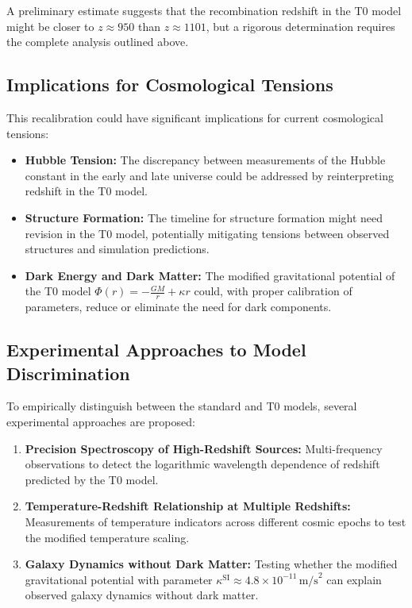 \documentclass[12pt,a4paper]{article}
\begin{document}
	A preliminary estimate suggests that the recombination redshift in the T0 model might be closer to $z \approx 950$ than $z \approx 1101$, but a rigorous determination requires the complete analysis outlined above.
	
	\subsection{Implications for Cosmological Tensions}
	\label{subsec:cosmological_tensions}
	
	This recalibration could have significant implications for current cosmological tensions:
	
	\begin{itemize}
		\item \textbf{Hubble Tension:} The discrepancy between measurements of the Hubble constant in the early and late universe could be addressed by reinterpreting redshift in the T0 model.
		
		\item \textbf{Structure Formation:} The timeline for structure formation might need revision in the T0 model, potentially mitigating tensions between observed structures and simulation predictions.
		
		\item \textbf{Dark Energy and Dark Matter:} The modified gravitational potential of the T0 model $\Phi(r) = -\frac{GM}{r} + \kappa r$ could, with proper calibration of parameters, reduce or eliminate the need for dark components.
	\end{itemize}
	
	\subsection{Experimental Approaches to Model Discrimination}
	\label{subsec:model_discrimination}
	
	To empirically distinguish between the standard and T0 models, several experimental approaches are proposed:
	
	\begin{enumerate}
		\item \textbf{Precision Spectroscopy of High-Redshift Sources:} Multi-frequency observations to detect the logarithmic wavelength dependence of redshift predicted by the T0 model.
		
		\item \textbf{Temperature-Redshift Relationship at Multiple Redshifts:} Measurements of temperature indicators across different cosmic epochs to test the modified temperature scaling.
		
		\item \textbf{Galaxy Dynamics without Dark Matter:} Testing whether the modified gravitational potential with parameter $\kappa^{\text{SI}} \approx 4.8 \times 10^{-11} \, \text{m/s}^2$ can explain observed galaxy dynamics without dark matter.
	\end{enumerate}
	
\end{document}
